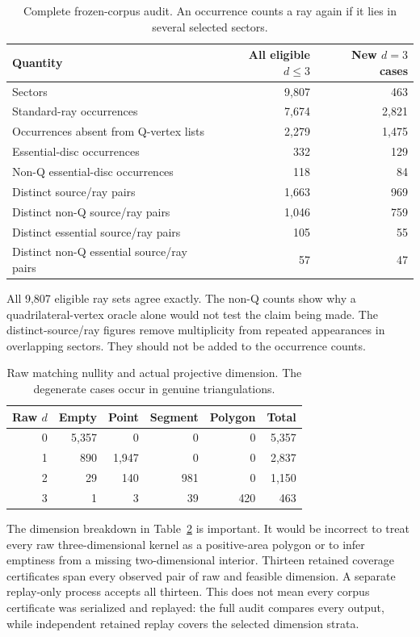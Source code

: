 \begin{table}[htbp]
\centering
\caption{Complete frozen-corpus audit.  An occurrence counts a ray
again if it lies in several selected sectors.}
\label{tab:corpus}
\small
\begin{tabular}{lrr}
\toprule
Quantity & All eligible \(d\le3\) & New \(d=3\) cases\\
\midrule
Sectors & 9,807 & 463\\
Standard-ray occurrences & 7,674 & 2,821\\
Occurrences absent from Q-vertex lists & 2,279 & 1,475\\
Essential-disc occurrences & 332 & 129\\
Non-Q essential-disc occurrences & 118 & 84\\
Distinct source/ray pairs & 1,663 & 969\\
Distinct non-Q source/ray pairs & 1,046 & 759\\
Distinct essential source/ray pairs & 105 & 55\\
Distinct non-Q essential source/ray pairs & 57 & 47\\
\bottomrule
\end{tabular}
\end{table}

All 9,807 eligible ray sets agree exactly.  The non-Q counts show
why a quadrilateral-vertex oracle alone would not test the claim
being made.  The distinct-source/ray figures remove multiplicity
from repeated appearances in overlapping sectors.  They should
not be added to the occurrence counts.

\begin{table}[htbp]
\centering
\caption{Raw matching nullity and actual projective dimension.
The degenerate cases occur in genuine triangulations.}
\label{tab:strata}
\small
\begin{tabular}{rrrrrr}
\toprule
Raw \(d\) & Empty & Point & Segment & Polygon & Total\\
\midrule
0 & 5,357 & 0 & 0 & 0 & 5,357\\
1 & 890 & 1,947 & 0 & 0 & 2,837\\
2 & 29 & 140 & 981 & 0 & 1,150\\
3 & 1 & 3 & 39 & 420 & 463\\
\bottomrule
\end{tabular}
\end{table}

The dimension breakdown in Table~\ref{tab:strata} is important.
It would be incorrect to treat every raw three-dimensional kernel
as a positive-area polygon or to infer emptiness from a missing
two-dimensional interior.  Thirteen retained coverage certificates
span every observed pair of raw and feasible dimension.  A separate
replay-only process accepts all thirteen.  This does not mean
every corpus certificate was serialized and replayed: the full
audit compares every output, while independent retained replay
covers the selected dimension strata.

